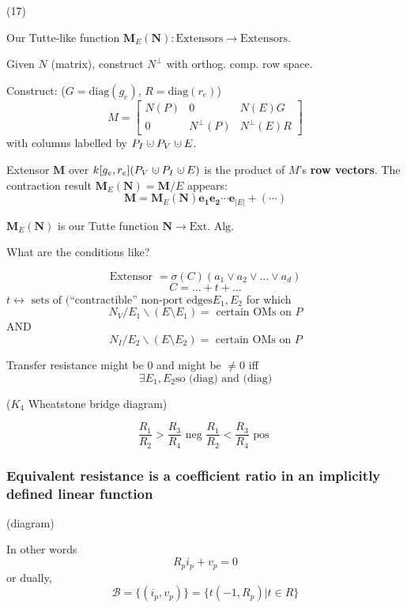 \documentclass{article}
\newcommand{\dunion}
{\mbox{\hbox{\hskip0.45em$\cdot$\hskip-0.44em$\cup$\hskip0.2em}}}
\begin{document}
\begin{frame}{(17)}


Our Tutte-like function $\mathbf{M}_E(\mathbf{N}):\text{Extensors}\rightarrow\text{Extensors}$.

Given $N$ (matrix), construct $N^\perp$ 
with orthog. comp. row space.

Construct:  ($G=\mbox{diag}(g_e)$, $R=\mbox{diag}(r_e)$)
\[
M = \left[\begin{array}{c|c|c} N(P)  &  0  &  N(E)G \\  \hline
0  & N^{\perp}(P)  &  N^{\perp}(E)R \end{array}\right]
\]
with columns labelled by $P_I\dunion P_V\dunion E$.

Extensor $\mathbf{M}$ over $k[g_e, r_e](P_V\dunion P_I \dunion E)$
is the product of $M$'s \textbf{row vectors}. The contraction result
$\mathbf{M}_E(\mathbf{N}) = \mathbf{M}/E$ appears:
\[
\mathbf{M} = \mathbf{M}_E(\mathbf{N})\mathbf{e_1}\mathbf{e_2}\cdots\mathbf{e}_{|E|} + (\cdots) 
\]

$\mathbf{M}_E(\mathbf{N})$ is our Tutte function $\mathbf{N}\rightarrow \text{Ext. Alg.}$

\end{frame}



\begin{frame}{What are the conditions like?}

\[
\text{Extensor\ }= \sigma(C)(a_1\vee a_2\vee \ldots \vee a_d)
\]
\[
C = \ldots + t + \ldots
\]
$t \leftrightarrow \text{\ sets of (``contractible'' non-port edges} 
E_1, E_2$ for which
\[
N_V/E_1\backslash(E\setminus E_1) = \text{\ certain OMs on\ } P
\]
AND
\[
N_I/E_2\backslash(E\setminus E_2) = \text{\ certain OMs on\ } P
\]

Transfer resistance might be 0 and might be $\neq 0$ iff
\[
\exists E_1, E_2 \text{so (diag) and (diag)}
\]

($K_4$ Wheatstone bridge diagram)

\[
\frac{R_1}{R_2} > \frac{R_3}{R_4} 
\text{\ neg\ }
\frac{R_1}{R_2} < \frac{R_3}{R_4} 
\text{\ pos\ }
\]

\end{frame}


\begin{frame}
\frametitle{Equivalent resistance is a coefficient ratio in an 
implicitly defined linear function}

(diagram)

In other words
\[
R_pi_p + v_p = 0
\]
or dually,
\[
\mathcal{B} = \{(i_p,v_p)\}
= \{ t(-1, R_p) | t\in R\}
\]

\end{frame}
\end{document}
